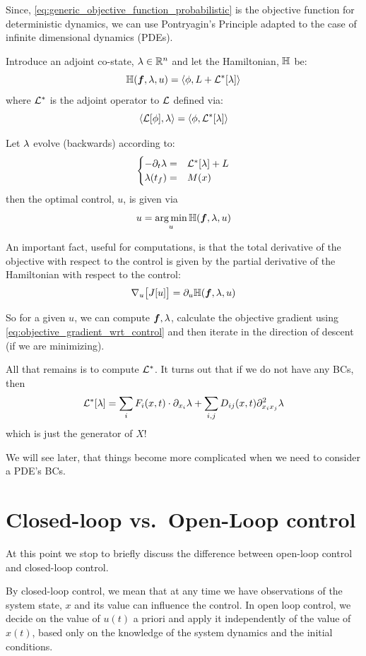 \documentclass{article}
\begin{document}
Since, \cref{eq:generic_objective_function_probabilistic} is the objective
function for deterministic dynamics, we can use Pontryagin's Principle adapted
to the case of infinite dimensional dynamics (PDEs). 

Introduce an adjoint co-state, ${\lambda} \in { \mathbb{R} }^n$ and let the Hamiltonian, ${ \mathbb{H}}$ be:
$$
{ \mathbb{H}}({ \boldsymbol{f} }, {\lambda}, u)= \langle \phi, L + { { \mathcal{L} }^* }[{\lambda}] \rangle$$
where ${ { \mathcal{L} }^* }$ is the adjoint operator to ${ \mathcal{L} }$ defined via:
$$
\langle { \mathcal{L} } [\phi], {\lambda} \rangle =\langle \phi, { { \mathcal{L} }^* }[{\lambda}] \rangle
$$

Let ${\lambda}$ evolve (backwards) according to:
\begin{equation*}
\begin{cases}
-{\partial}_t {\lambda} =& { { \mathcal{L} }^* }[{\lambda}] + L
\\
{\lambda}({ t_f }) =& M(x)  
\end{cases}
\end{equation*}
then the optimal control, $u$, is given via
$$
u = \argmin_u {\H(\f, \l, u)}
$$   

An important fact, useful for computations, is that the total derivative of the
objective with respect to the control is given by the partial derivative of the
Hamiltonian with respect to the control:
\begin{equation}
{ \nabla }_u \big[J[u] \big] = {\partial}_u { \mathbb{H}}({ \boldsymbol{f} }, {\lambda}, u)
\label{eq:objective_gradient_wrt_control}
\end{equation}

So for a given $u$, we can compute ${ \boldsymbol{f} },{\lambda}$, calculate the objective gradient
using \cref{eq:objective_gradient_wrt_control} and then iterate in the direction
of descent (if we are minimizing).

All that remains is to compute ${ { \mathcal{L} }^* }$. It turns out that if we do not have any
BCs, then
$$
{ { \mathcal{L} }^* }[{\lambda}] = \sum_i F_i(x,t) \cdot {\partial}_{x_i} {\lambda} + \sum_{i,j} D_{ij}(x,t)
{\partial}^2_{x_i x_j}{\lambda} 
$$ 
which is just the generator of $X$! 

We will see later, that things become more complicated when we need to
consider a PDE's BCs.

\section{Closed-loop vs.\ Open-Loop control}
At this point we stop to briefly discuss the difference between
open-loop control and closed-loop control. 

By closed-loop control, we mean that at any time we have observations of the
system state, $x$ and its value can influence the control. In open loop control,
we decide on the value of $u(t)$ a priori and apply it independently of the
value of $x(t)$, based only on the knowledge of the system dynamics and the
initial conditions. 
\end{document}
